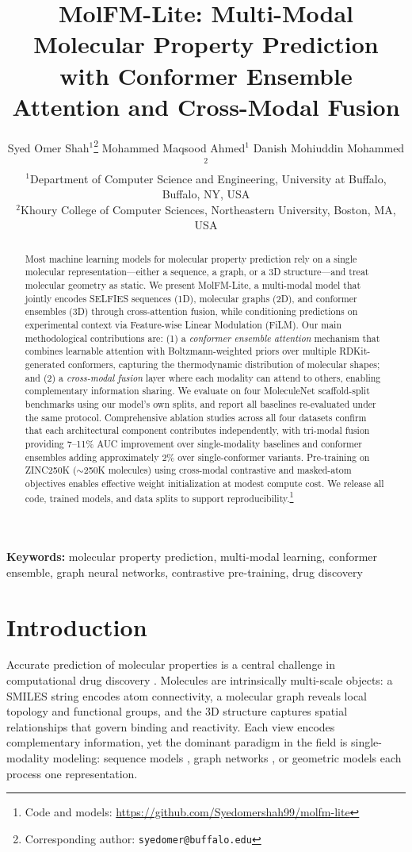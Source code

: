 \documentclass[11pt]{article}
\title{\textbf{MolFM-Lite: Multi-Modal Molecular Property Prediction\\
with Conformer Ensemble Attention and Cross-Modal Fusion}}
\author{
Syed Omer Shah$^{1}$\thanks{Corresponding author: \texttt{syedomer@buffalo.edu}} \quad
Mohammed Maqsood Ahmed$^{1}$ \quad
Danish Mohiuddin Mohammed$^{2}$ \\[0.5em]
$^{1}$Department of Computer Science and Engineering, University at Buffalo, Buffalo, NY, USA \\
$^{2}$Khoury College of Computer Sciences, Northeastern University, Boston, MA, USA
}
\date{}
\newcommand{\modelname}{MolFM-Lite}
\begin{document}
\maketitle

\begin{abstract}
Most machine learning models for molecular property prediction rely on a single molecular representation---either a sequence, a graph, or a 3D structure---and treat molecular geometry as static. We present \modelname{}, a multi-modal model that jointly encodes SELFIES sequences (1D), molecular graphs (2D), and conformer ensembles (3D) through cross-attention fusion, while conditioning predictions on experimental context via Feature-wise Linear Modulation (FiLM). Our main methodological contributions are: (1) a \textit{conformer ensemble attention} mechanism that combines learnable attention with Boltzmann-weighted priors over multiple RDKit-generated conformers, capturing the thermodynamic distribution of molecular shapes; and (2) a \textit{cross-modal fusion} layer where each modality can attend to others, enabling complementary information sharing. We evaluate on four MoleculeNet scaffold-split benchmarks using our model's own splits, and report all baselines re-evaluated under the same protocol. Comprehensive ablation studies across all four datasets confirm that each architectural component contributes independently, with tri-modal fusion providing 7--11\% AUC improvement over single-modality baselines and conformer ensembles adding approximately 2\% over single-conformer variants. Pre-training on ZINC250K ($\sim$250K molecules) using cross-modal contrastive and masked-atom objectives enables effective weight initialization at modest compute cost. We release all code, trained models, and data splits to support reproducibility.\footnote{Code and models: \url{https://github.com/Syedomershah99/molfm-lite}}
\end{abstract}

\textbf{Keywords:} molecular property prediction, multi-modal learning, conformer ensemble, graph neural networks, contrastive pre-training, drug discovery

\section{Introduction}
\label{sec:introduction}

Accurate prediction of molecular properties is a central challenge in computational drug discovery \citep{vamathevan2019applications}. Molecules are intrinsically multi-scale objects: a SMILES string encodes atom connectivity, a molecular graph reveals local topology and functional groups, and the 3D structure captures spatial relationships that govern binding and reactivity. Each view encodes complementary information, yet the dominant paradigm in the field is single-modality modeling: sequence models \citep{chithrananda2020chemberta}, graph networks \citep{rong2020grover}, or geometric models \citep{schutt2017schnet} each process one representation.
\end{document}
